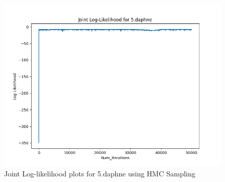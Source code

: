\documentclass{article}
\begin{document}
\begin{enumerate}
\begin{enumerate}
\begin{figure}[!ht]
	\centering
	\includegraphics[scale=0.5]{../figs/Gibbs/joint_log_likelihood_5_daphne}
	 \caption{Joint Log-likelihood plots for 5.daphne using HMC Sampling}
\end{figure}
\end{enumerate}
\end{enumerate}
\end{document}
